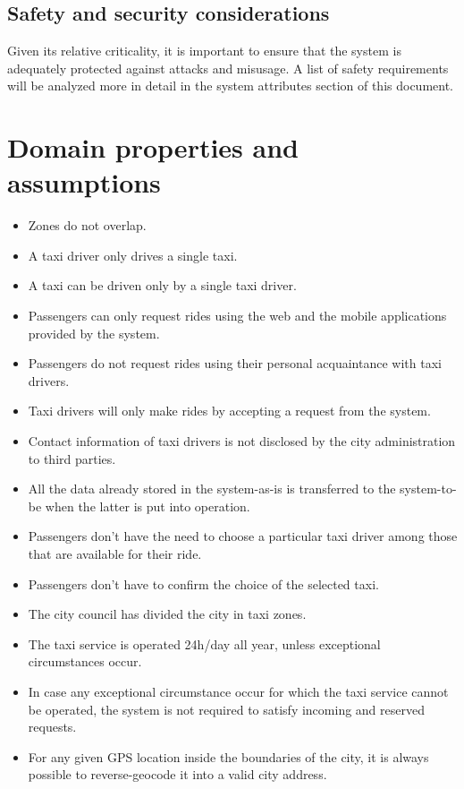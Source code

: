 \subsection{Safety and security considerations}
Given its relative criticality, it is important to ensure that the system is adequately protected against attacks and misusage. A list of safety requirements will be analyzed more in detail in the system attributes section of this document.


\section{Domain properties and assumptions}
\begin{itemize}
\item Zones do not overlap.
\item A taxi driver only drives a single taxi.
\item A taxi can be driven only by a single taxi driver.
\item Passengers can only request rides using the web and the mobile applications provided by the system.
\item Passengers do not request rides using their personal acquaintance with taxi drivers.
\item Taxi drivers will only make rides by accepting a request from the system.
\item Contact information of taxi drivers is not disclosed by the city administration to third parties.
\item All the data already stored in the system-as-is is transferred to the system-to-be when the latter is put into operation.
\item Passengers don't have the need to choose a particular taxi driver among those that are available for their ride.
\item Passengers don't have to confirm the choice of the selected taxi.
\item The city council has divided the city in taxi zones.
\item The taxi service is operated 24h/day all year, unless exceptional circumstances occur.
\item In case any exceptional circumstance occur for which the taxi service cannot be operated, the system is not required to satisfy incoming and reserved requests. 
\item For any given GPS location inside the boundaries of the city, it is always possible to reverse-geocode it into a valid city address. 

\end{itemize}
